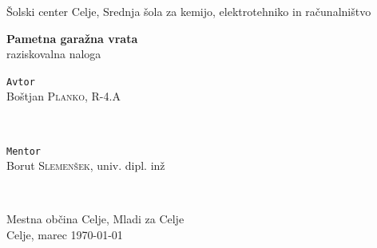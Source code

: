 \documentclass[11pt]{article}
\begin{document}
\begin{titlepage}
\thispagestyle{empty}
   \center
   \fancyhead{}
   \large{Šolski center Celje, Srednja šola za kemijo, elektrotehniko in računalništvo}\\[1.5cm]
   \vspace*{\fill}
   \begin{center}
   \Huge{\bfseries Pametna garažna vrata}\\
   \vspace{1mm}
   \large{raziskovalna naloga}
   \end{center}
   \vspace*{\fill}

	\begin{minipage}{0.4\textwidth}
		\begin{flushleft}
		\vspace{4.5mm}
			\large
			\texttt{Avtor}\\
			Boštjan \textsc{Planko}, R-4.A \\ %
		\end{flushleft}
	\end{minipage}
	~
	\begin{minipage}{0.5\textwidth}
		\begin{flushright}
			\large
			\texttt{Mentor}\\
			Borut \textsc{Slemenšek},  univ. dipl. inž %
		\end{flushright}
	\end{minipage}
	~
	\begin{minipage}{0.5\textwidth}
		\begin{center}
		    \vspace{5mm}
		    Mestna občina Celje, Mladi za Celje\\
			\large{Celje, marec \monthyeardate\today}
		\end{center}
	\end{minipage}
	\fancyfoot{}
\end{titlepage}
\end{document}

